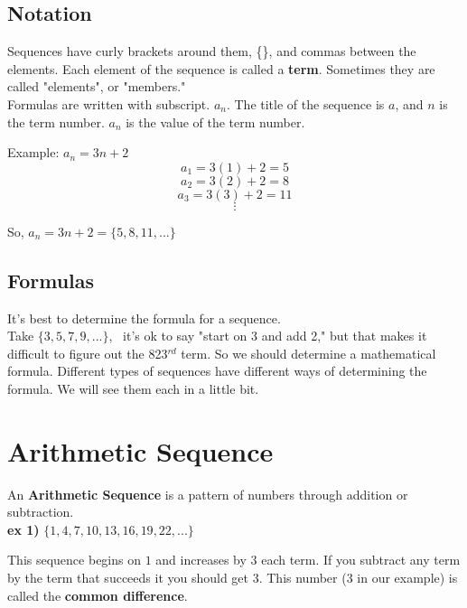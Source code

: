 \documentclass[12pt]{article}
\begin{document}
\subsection{Notation}

Sequences have curly brackets around them, \{\}, and commas between the elements. Each element of the sequence is called a \textbf{term}. Sometimes they are called "elements", or "members."\\

Formulas are written with subscript. $a_n$. The title of the sequence is $a$, and $n$ is the term number. $a_n$ is the value of the term number.\\

\begin{addmargin}[4em]{1em}

	Example:	$a_n=3n+2$\\
	
				$$a_1=3(1)+2=5$$
				$$a_2=3(2)+2=8$$
				$$a_3=3(3)+2=11$$
				$$\vdots$$
				
			So, $a_n=3n+2=\{5,8,11,...\}$

\end{addmargin}


\subsection{Formulas}

It's best to determine the formula for a sequence.\\

Take $\{3,5,7,9,...\}$, \ it's ok to say "start on 3 and add 2," but that makes it difficult to figure out the 823$^{rd}$ term.  So we should determine a mathematical formula. Different types of sequences have different ways of determining the formula. We will see them each in a little bit.\\





\section{Arithmetic Sequence}

An \textbf{Arithmetic Sequence} is a pattern of numbers through addition or subtraction.\\

\textbf{ex 1)} $\{1,4,7,10,13,16,19,22,...\}$

This sequence begins on $1$ and increases by $3$ each term. If you subtract any term by the term that succeeds it you should get $3$. This number ($3$ in our example) is called the \textbf{common difference}.\\
\end{document}
